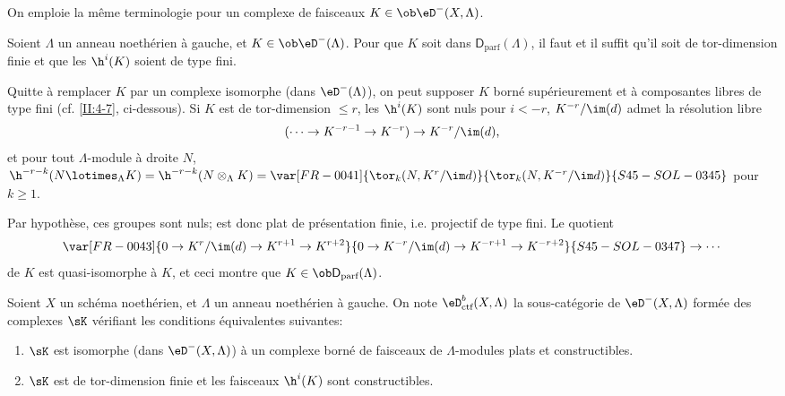 On emploie la même terminologie pour un complexe de faisceaux 
$K\in\ob\eD^-(X,\Lambda)$. 





\begin{lemma}\label{II:4-5-1} 
Soient $\Lambda$ un anneau noethérien à gauche, et $K\in\ob\eD^-(\Lambda)$. 
Pour que $K$ soit dans $\mathsf{D}_\text{parf}(\Lambda)$, il faut et il suffit 
qu'il soit de tor-dimension finie et que les $\h^i(K)$ soient de type fini.
\end{lemma}

Quitte à remplacer $K$ par un complexe isomorphe (dans $\eD^-(\Lambda)$), on 
peut supposer $K$ borné supérieurement et à composantes libres de type 
fini (cf. \ref{II:4-7}, ci-dessous). Si $K$ est de tor-dimension $\leqslant r$, 
les $\h^i(K)$ sont nuls pour $i<-r$, $K^{-r}/\im(d)$ admet la résolution 
libre 
\[
  (\cdots \to K^{-r-1} \to K^{-r}) \to K^{-r}/\im(d) \text{,}
\]
et pour tout $\Lambda$-module à droite $N$, 
$\h^{-r-k}(N\lotimes_\Lambda K) = \h^{-r-k}(N\otimes_\Lambda K) 
= \var[FR-0041]{\tor_k(N,K^r/\im d)}{\tor_k(N,K^{-r}/\im d)}{S45-SOL-0345}$ pour $k\geqslant 1$. 

Par hypothèse, ces groupes sont nuls;  est donc plat de 
présentation finie, i.e. projectif de type fini. Le quotient 
\[
  \var[FR-0043]{0 \to K^r/\im(d) \to K^{r+1} \to K^{r+2}}{0 \to K^{-r}/\im(d) \to K^{-r+1} \to K^{-r+2}}{S45-SOL-0347}\to \cdots 
\]
de $K$ est quasi-isomorphe à $K$, et ceci montre que 
$K\in\ob\mathsf{D}_\text{parf}(\Lambda)$. 





\begin{prop-def_}\label{II:4-6}
Soient $X$ un schéma noethérien, et $\Lambda$ un anneau noethérien à 
gauche. On note $\eD_\textnormal{ctf}^b(X,\Lambda)$ la sous-catégorie de 
$\eD^-(X,\Lambda)$ formée des complexes $\sK$ vérifiant les conditions 
équivalentes suivantes:
\begin{enumerate}[\indent i)]
  \item $\sK$ est isomorphe (dans $\eD^-(X,\Lambda)$) à un complexe borné de 
    faisceaux de $\Lambda$-modules plats et constructibles. 
  \item $\sK$ est de tor-dimension finie et les faisceaux $\h^i(K)$ sont 
    constructibles. 
\end{enumerate}
\end{prop-def_}


